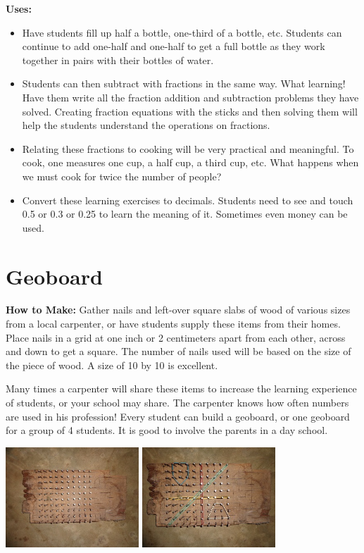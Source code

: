 \noindent\textbf{Uses:}
\begin{itemize}
\item Have students fill up half a bottle, one-third of a bottle, etc. Students can continue to add one-half and one-half to get a full bottle as they work together in pairs with their bottles of water.
\item Students can then subtract with fractions in the same way. What learning! Have them write all the fraction addition and subtraction problems they have solved. Creating fraction equations with the sticks and then solving them will help the students understand the operations on fractions.
\item Relating these fractions to cooking will be very practical and meaningful. To cook, one measures one cup, a half cup, a third cup, etc. What happens when we must cook for twice the number of people?
\item Convert these learning exercises to decimals. Students need to see and touch 0.5 or 0.3 or 0.25 to learn the meaning of it. Sometimes even money can be used.
\end{itemize}

\section{Geoboard} \label{geoboard}
\textbf{How to Make:} Gather nails and left-over square slabs of wood of various sizes from a local carpenter, or have students supply these items from their homes. Place nails in a grid at one inch or 2 centimeters apart from each other, across and down to get a square. The number of nails used will be based on the size of the piece of wood. A size of 10 by 10 is excellent. 

Many times a carpenter will share these items to increase the learning experience of students, or your school may share. The carpenter knows how often numbers are used in his profession! Every student can build a geoboard, or one geoboard for a group of 4 students. It is good to involve the parents in a day school.

	\begin{center}
	\includegraphics[width=5cm]{./img/gb1.jpg}
	\includegraphics[width=5cm]{./img/gb2.jpg}
	\end{center}

